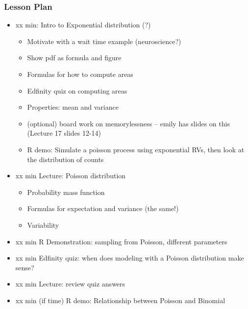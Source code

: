 \begin{frame}
    \frametitle{Lesson Plan}
    \begin{itemize}
        \item xx min: Intro to Exponential distribution (?)
        \begin{itemize}
            \item Motivate with a wait time example (neuroscience?)
            \item Show pdf as formula and figure
            \item Formulas for how to compute areas
            \item Edfinity quiz on computing areas
            \item Properties: mean and variance
            \item (optional) board work on memorylessness -- emily has slides on this (Lecture 17 slides 12-14)
            \item R demo: Simulate a poisson process using exponential RVs, then look at the distribution of counts
        \end{itemize}
        \item xx min Lecture: Poisson distribution
        \begin{itemize}
            \item Probability mass function
            \item Formulas for expectation and variance (the same!)
            \item Variability
        \end{itemize}
        \item xx min R Demonstration: sampling from Poisson, different parameters
        \item xx min Edfinity quiz: when does modeling with a Poisson distribution make sense?
        \item xx min Lecture: review quiz answers
        \item xx min (if time) R demo: Relationship between Poisson and Binomial
    \end{itemize}
\end{frame}
    
